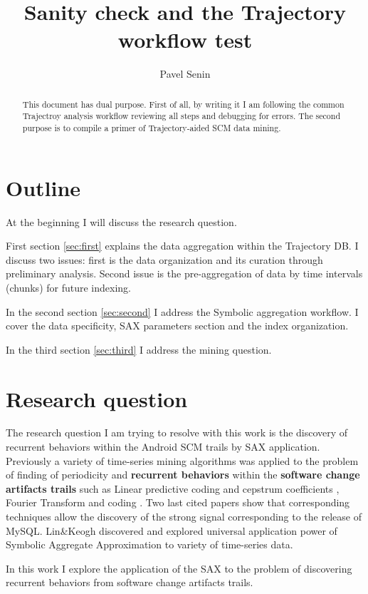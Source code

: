 \documentclass[a4paper,10pt]{article}
\title{Sanity check and the Trajectory workflow test}
\author{Pavel Senin}
\numberwithin{equation}{subsection}
\begin{document}
\maketitle

\begin{abstract}
This document has dual purpose. First of all, by writing it I am following the common Trajectroy analysis workflow reviewing 
all steps and debugging for errors. The second purpose is to compile a primer of Trajectory-aided SCM data mining.
\end{abstract}

\section{Outline}
At the beginning I will discuss the research question.

First section \ref{sec:first} explains the data aggregation within the Trajectory DB. I discuss two issues: first is
the data organization and its curation through preliminary analysis. Second issue is the pre-aggregation of data by 
time intervals (chunks) for future indexing.

In the second section \ref{sec:second} I address the Symbolic aggregation workflow. I cover the data specificity,
SAX parameters section and the index organization.

In the third section \ref{sec:third} I address the mining question.

\section{Research question}
The research question I am trying to resolve with this work is the discovery of recurrent behaviors within the Android SCM
trails by SAX application. Previously a variety of time-series mining algorithms was applied to the problem of finding
of periodicity and \textbf{recurrent behaviors} within the \textbf{software change artifacts trails} such as Linear predictive
coding and cepstrum coefficients \cite{citeulike:3378725}, Fourier Transform \cite{citeulike:10377345}
and coding \cite{citeulike:10377366}. Two last cited papers show that corresponding techniques allow the discovery of the 
strong signal corresponding to the release of MySQL.
Lin\&Keogh \cite{citeulike:2821475} discovered and explored universal application power 
of Symbolic Aggregate Approximation to variety of time-series data. 

In this work I explore the application of the SAX to the problem of discovering recurrent behaviors from software change 
artifacts trails.
\end{document}
